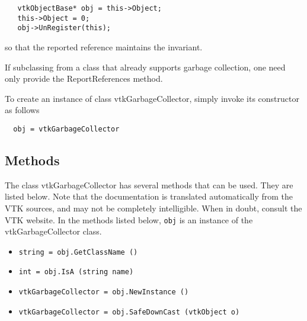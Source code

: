  \begin{verbatim}
   vtkObjectBase* obj = this->Object;
   this->Object = 0;
   obj->UnRegister(this);
 \end{verbatim}

 so that the reported reference maintains the invariant.

 If subclassing from a class that already supports garbage
 collection, one need only provide the ReportReferences method.

To create an instance of class vtkGarbageCollector, simply
invoke its constructor as follows
\begin{verbatim}
  obj = vtkGarbageCollector
\end{verbatim}
\subsection{Methods}

The class vtkGarbageCollector has several methods that can be used.
  They are listed below.
Note that the documentation is translated automatically from the VTK sources,
and may not be completely intelligible.  When in doubt, consult the VTK website.
In the methods listed below, \verb|obj| is an instance of the vtkGarbageCollector class.
\begin{itemize}
\item  \verb|string = obj.GetClassName ()|

\item  \verb|int = obj.IsA (string name)|

\item  \verb|vtkGarbageCollector = obj.NewInstance ()|

\item  \verb|vtkGarbageCollector = obj.SafeDownCast (vtkObject o)|

\end{itemize}

